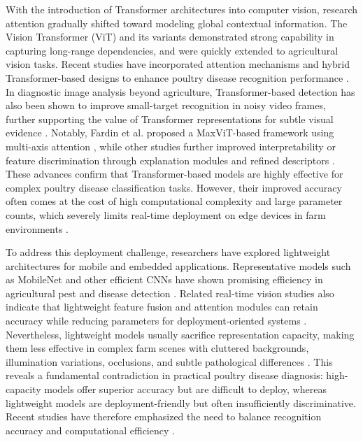 \documentclass[review]{elsarticle}
\begin{document}
With the introduction of Transformer architectures into computer vision, research attention gradually shifted toward modeling global contextual information.
The Vision Transformer (ViT) \cite{dosovitskiy2020image} and its variants demonstrated strong capability in capturing long-range dependencies, and were quickly extended to agricultural vision tasks.
Recent studies have incorporated attention mechanisms and hybrid Transformer-based designs to enhance poultry disease recognition performance \cite{li2023attention,he2023reliable,wang2023swin}.
In diagnostic image analysis beyond agriculture, Transformer-based detection has also been shown to improve small-target recognition in noisy video frames, further supporting the value of Transformer representations for subtle visual evidence \cite{liu2024tiny}.
Notably, Fardin et al. \cite{fardin2025robust} proposed a MaxViT-based framework using multi-axis attention \cite{tu2022maxvit}, while other studies further improved interpretability or feature discrimination through explanation modules and refined descriptors \cite{luong2024improving,khan2025assessment,ren2024research}.
These advances confirm that Transformer-based models are highly effective for complex poultry disease classification tasks.
However, their improved accuracy often comes at the cost of high computational complexity and large parameter counts, which severely limits real-time deployment on edge devices in farm environments \cite{luo2025optimizing,zhang2023edge,eurasipproceedings2024}.

To address this deployment challenge, researchers have explored lightweight architectures for mobile and embedded applications.
Representative models such as MobileNet \cite{howard2019searching,sandler2018mobilenetv2} and other efficient CNNs have shown promising efficiency in agricultural pest and disease detection \cite{chen2023lightweight,singh2024comprehensive}.
Related real-time vision studies also indicate that lightweight feature fusion and attention modules can retain accuracy while reducing parameters for deployment-oriented systems \cite{hu2024lffnet}.
Nevertheless, lightweight models usually sacrifice representation capacity, making them less effective in complex farm scenes with cluttered backgrounds, illumination variations, occlusions, and subtle pathological differences \cite{chidziwisano2025deep,degu2023smartphone}.
This reveals a fundamental contradiction in practical poultry disease diagnosis: high-capacity models offer superior accuracy but are difficult to deploy, whereas lightweight models are deployment-friendly but often insufficiently discriminative.
Recent studies have therefore emphasized the need to balance recognition accuracy and computational efficiency \cite{srivastava2023deep,bingol2023prediction,mirbhageri2023survey}.
\end{document}
